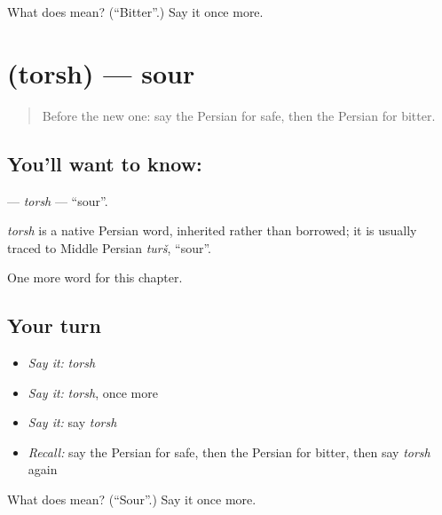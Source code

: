 \begin{tcolorbox}[breakable,colback=teal!4,colframe=teal!35!black,title={Before you move on}]
What does  mean? (\textquotedblleft{}Bitter\textquotedblright{}.) Say it once more.
\end{tcolorbox}
\section[\texorpdfstring{\fa{ترش} (torsh)}{ترش (torsh)}]{ (torsh) — sour}

\label{lesson:FA-C127-torsh}



\begin{quote}
Before the new one: say the Persian for safe, then the Persian for bitter.
\end{quote}

\subsection*{You'll want to know: }
\textbf{} — \emph{torsh} — \textquotedblleft{}sour\textquotedblright{}.

\begin{cousinweb}
\emph{torsh} is a native Persian word, inherited rather than borrowed; it is usually traced to Middle Persian \emph{turš}, \textquotedblleft{}sour\textquotedblright{}.
\end{cousinweb}

\begin{grammarlens}[title={What you've built}]
One more word for this chapter.
\end{grammarlens}

\subsection*{Your turn}
\begin{itemize}
\raggedright
  \item \emph{Say it:} \emph{torsh}
  \item \emph{Say it:} \emph{torsh}, once more
  \item \emph{Say it:} say \emph{torsh}
  \item \emph{Recall:} say the Persian for safe, then the Persian for bitter, then say \emph{torsh} again
\end{itemize}

\begin{tcolorbox}[breakable,colback=teal!4,colframe=teal!35!black,title={Before you move on}]
What does  mean? (\textquotedblleft{}Sour\textquotedblright{}.) Say it once more.
\end{tcolorbox}
